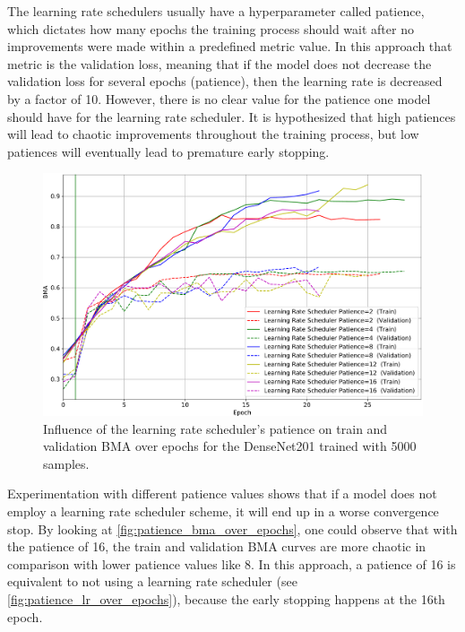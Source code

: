     The learning rate schedulers usually have a hyperparameter called patience, which dictates how many epochs the training process should wait after no improvements were made within a predefined metric value. In this approach that metric is the validation loss, meaning that if the model does not decrease the validation loss for several epochs (patience), then the learning rate is decreased by a factor of 10. However, there is no clear value for the patience one model should have for the learning rate scheduler. It is hypothesized that high patiences will lead to chaotic improvements throughout the training process, but low patiences will eventually lead to premature early stopping. \par
    
    \begin{figure}[ht]
        \centering
        \includegraphics[width=\textwidth]{figs/densenet201_patience_over_epochs.pdf}
        \caption{Influence of the learning rate scheduler's patience on train and validation \ac{BMA} over epochs for the DenseNet201 trained with 5000 samples.}
        \label{fig:patience_bma_over_epochs}
    \end{figure}
    
    Experimentation with different patience values shows that if a model does not employ a learning rate scheduler scheme, it will end up in a worse convergence stop. By looking at \autoref{fig:patience_bma_over_epochs}, one could observe that with the patience of 16, the train and validation \ac{BMA} curves are more chaotic in comparison with lower patience values like 8. In this approach, a patience of 16 is equivalent to not using a learning rate scheduler (see \autoref{fig:patience_lr_over_epochs}), because the early stopping happens at the 16th epoch. \par
    
